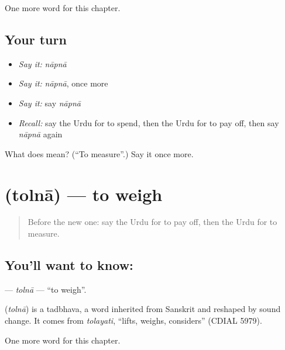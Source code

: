 \begin{grammarlens}[title={What you've built}]
One more word for this chapter.
\end{grammarlens}

\subsection*{Your turn}
\begin{itemize}
\raggedright
  \item \emph{Say it:} \emph{nāpnā}
  \item \emph{Say it:} \emph{nāpnā}, once more
  \item \emph{Say it:} say \emph{nāpnā}
  \item \emph{Recall:} say the Urdu for to spend, then the Urdu for to pay off, then say \emph{nāpnā} again
\end{itemize}

\begin{tcolorbox}[breakable,colback=teal!4,colframe=teal!35!black,title={Before you move on}]
What does  mean? (\textquotedblleft{}To measure\textquotedblright{}.) Say it once more.
\end{tcolorbox}
\section[\texorpdfstring{\ur{تولنا} (tolnā)}{تولنا (tolnā)}]{ (tolnā) — to weigh}

\label{lesson:UR-C181-tolna}



\begin{quote}
Before the new one: say the Urdu for to pay off, then the Urdu for to measure.
\end{quote}

\subsection*{You'll want to know: }
\textbf{} — \emph{tolnā} — \textquotedblleft{}to weigh\textquotedblright{}.

\begin{cousinweb}
\textbf{} (\emph{tolnā}) is a tadbhava, a word inherited from Sanskrit and reshaped by sound change. It comes from \emph{tolayati}, \textquotedblleft{}lifts, weighs, considers\textquotedblright{} (CDIAL 5979).
\end{cousinweb}

\begin{grammarlens}[title={What you've built}]
One more word for this chapter.
\end{grammarlens}

